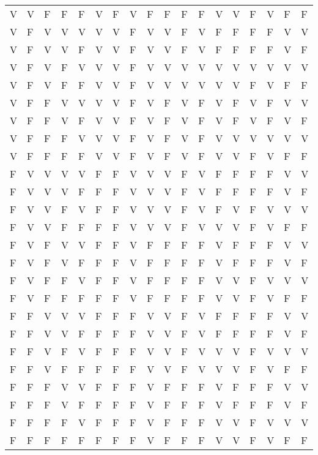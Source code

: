 \documentclass[a4paper,10pt]{article}
\begin{document}
\begin{enumerate}
\begin{center}
\begin{tabular}{llllllllllllllllll}
V & V & F & F & F & V & F & V & F & F & F & F & V & V & F & V & F & F\\
V & F & V & V & V & V & V & F & V & V & F & V & F & F & F & F & V & V\\
V & F & V & V & F & V & V & F & V & V & F & V & F & F & F & F & V & F\\
V & F & V & F & V & V & V & F & V & V & V & V & V & V & V & V & V & V\\
V & F & V & F & F & V & V & F & V & V & V & V & V & V & F & V & F & F\\
V & F & F & V & V & V & V & F & V & F & V & F & V & F & V & F & V & V\\
V & F & F & V & F & V & V & F & V & F & V & F & V & F & V & F & V & F\\
V & F & F & F & V & V & V & F & V & F & V & F & V & V & V & V & V & V\\
V & F & F & F & F & V & V & F & V & F & V & F & V & V & F & V & F & F\\
F & V & V & V & V & F & F & V & V & V & F & V & F & F & F & F & V & V\\
F & V & V & V & F & F & F & V & V & V & F & V & F & F & F & F & V & F\\
F & V & V & F & V & F & F & V & V & V & F & V & F & V & F & V & V & V\\
F & V & V & F & F & F & F & V & V & V & F & V & V & V & F & V & F & F\\
F & V & F & V & V & F & F & V & F & F & F & F & V & F & F & F & V & V\\
F & V & F & V & F & F & F & V & F & F & F & F & V & F & F & F & V & F\\
F & V & F & F & V & F & F & V & F & F & F & F & V & V & F & V & V & V\\
F & V & F & F & F & F & F & V & F & F & F & F & V & V & F & V & F & F\\
F & F & V & V & V & F & F & F & V & V & F & V & F & F & F & F & V & V\\
F & F & V & V & F & F & F & F & V & V & F & V & F & F & F & F & V & F\\
F & F & V & F & V & F & F & F & V & V & F & V & V & V & F & V & V & V\\
F & F & V & F & F & F & F & F & V & V & F & V & V & V & F & V & F & F\\
F & F & F & V & V & F & F & F & V & F & F & F & V & F & F & F & V & V\\
F & F & F & V & F & F & F & F & V & F & F & F & V & F & F & F & V & F\\
F & F & F & F & V & F & F & F & V & F & F & F & V & V & F & V & V & V\\
F & F & F & F & F & F & F & F & V & F & F & F & V & V & F & V & F & F
\end{tabular}
\end{center}


\end{enumerate}
\end{document}
